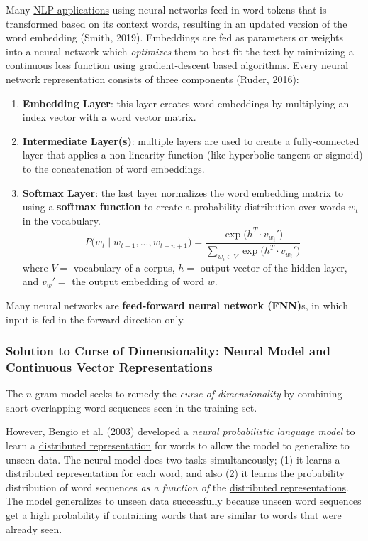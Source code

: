 Many \hyperref[app:Appendix_NLPTasks]{NLP applications} using neural networks feed in word tokens that is transformed based on its context words, resulting in an updated version of the word embedding (Smith, 2019). Embeddings are fed as parameters or weights into a neural network which \emph{optimizes} them to best fit the text by minimizing a continuous loss function using gradient-descent based algorithms. Every neural network representation consists of three components (Ruder, 2016):

\begin{enumerate}
    \item \textbf{Embedding Layer}\label{cnc:embeddingLayer}: this layer creates word embeddings by multiplying an index vector with a word vector matrix. 
    
    \item \textbf{Intermediate Layer(s)}: multiple layers are used to create a fully-connected layer that applies a non-linearity function (like hyperbolic tangent or sigmoid) to the concatenation of word embeddings. 
    
    \item \textbf{Softmax Layer}\label{cnc:softmaxLayer}: the last layer normalizes the word embedding matrix to using a \textbf{softmax function} to create a probability distribution over words $w_t$ in the vocabulary. 
    $$
    P \Big(w_t \; | \; w_{t-1}, ..., w_{t-n+1} \Big) = \frac {\exp{ \Big(h^T \cdot v_{w_t}' \Big) }} {\sum_{w_i \in V} \exp{ \Big(h^T \cdot v_{w_i}' \Big) }}
    $$
    where $V = $ vocabulary of a corpus, $h = $ output vector of the hidden layer, and $v_w' = $ the output embedding of word $w$. 
\end{enumerate}

Many neural networks are \textbf{feed-forward neural network (FNN)}\label{cnc:ffn}s, in which input is fed in the forward direction only. 


\subsubsection{Solution to Curse of Dimensionality: Neural Model and Continuous Vector Representations} \label{sec:SolutionToCurseDim}

The $n$-gram model seeks to remedy the \emph{curse of dimensionality} by combining short overlapping word sequences seen in the training set. 

However, Bengio et al. (2003) developed a \emph{neural probabilistic language model} to learn a \hyperref[sec:DistributedRepr]{distributed representation} for words to allow the model to generalize to unseen data. The neural model does two tasks simultaneously; (1) it learns a \hyperref[sec:DistributedRepr]{distributed representation} for each word, and also (2) it learns the probability distribution of word sequences \emph{as a function of} the \hyperref[sec:DistributedRepr]{distributed representations}. The model generalizes to unseen data successfully because unseen word sequences get a high probability if containing words that are similar to words that were already seen.  

